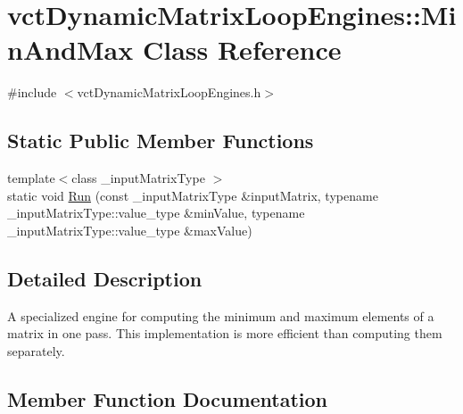 \hypertarget{classvct_dynamic_matrix_loop_engines_1_1_min_and_max}{}\section{vct\+Dynamic\+Matrix\+Loop\+Engines\+:\+:Min\+And\+Max Class Reference}
\label{classvct_dynamic_matrix_loop_engines_1_1_min_and_max}


{\ttfamily \#include $<$vct\+Dynamic\+Matrix\+Loop\+Engines.\+h$>$}

\subsection*{Static Public Member Functions}
\begin{DoxyCompactItemize}
\item 
{\footnotesize template$<$class \+\_\+input\+Matrix\+Type $>$ }\\static void \hyperlink{classvct_dynamic_matrix_loop_engines_1_1_min_and_max_a78ed7a948a1ba0bc51d07ec77baeafff}{Run} (const \+\_\+input\+Matrix\+Type \&input\+Matrix, typename \+\_\+input\+Matrix\+Type\+::value\+\_\+type \&min\+Value, typename \+\_\+input\+Matrix\+Type\+::value\+\_\+type \&max\+Value)
\end{DoxyCompactItemize}


\subsection{Detailed Description}
A specialized engine for computing the minimum and maximum elements of a matrix in one pass. This implementation is more efficient than computing them separately. 

\subsection{Member Function Documentation}
\hypertarget{classvct_dynamic_matrix_loop_engines_1_1_min_and_max_a78ed7a948a1ba0bc51d07ec77baeafff}{}
